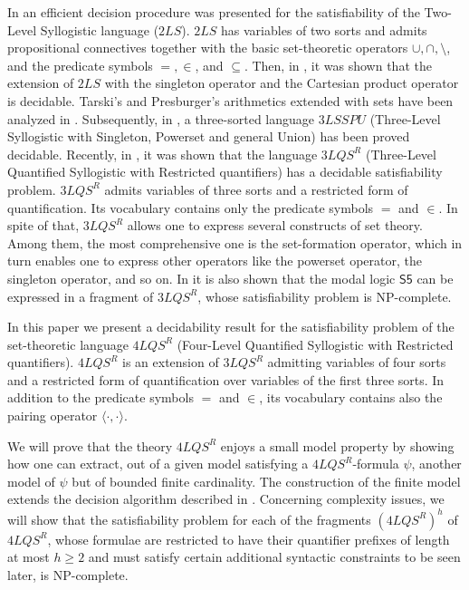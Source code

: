 \documentclass{fundam}
\newcommand{\Sc}{\mathsf{S5}}
\newcommand{\QLQSR}{\ensuremath{\mbox{$4\mathit{LQS}^{R}$}}\xspace}
\newcommand{\TLQSR}{\ensuremath{\mbox{$3\mathit{LQS}^{R}$}}\xspace}
\begin{document}
In \cite{FerOm1978} an efficient decision procedure was presented for
the satisfiability of the Two-Level Syllogistic language ($2LS$).
$2LS$ has variables of two sorts and admits propositional connectives
together with the basic set-theoretic operators $\cup,\cap,
\setminus$, and the predicate symbols $=,\in$, and $\subseteq$.  Then,
in \cite{CanCut90}, it was shown that the extension of $2LS$ with the
singleton operator and the Cartesian product operator is decidable.
Tarski's and Presburger's arithmetics extended with sets have been
analyzed in \cite{CCS90}.  Subsequently, in \cite{CanCut93}, a
three-sorted language $3LSSPU$ (Three-Level Syllogistic with
Singleton, Powerset and general Union) has been proved decidable.
Recently, in \cite{CanNic08}, it was shown that the language $\TLQSR$
(Three-Level Quantified Syllogistic with Restricted quantifiers) has a
decidable satisfiability problem.  $\TLQSR$ admits variables of three
sorts and a restricted form of quantification.  Its vocabulary
contains only the predicate symbols $=$ and $\in$.  In spite of that,
$\TLQSR$ allows one to express several constructs of set theory.
Among them, the most comprehensive one is the set-formation operator, which in
turn enables one to express other operators like the powerset
operator, the singleton operator, and so on.  In \cite{CanNic08} it is
also shown that the modal logic $\Sc$ can be expressed in a
fragment of $\TLQSR$, whose satisfiability problem is
\textsf{NP}-complete.

In this paper we present a decidability result for the satisfiability
problem of the set-theoretic language $\QLQSR$ (Four-Level Quantified
Syllogistic with Restricted quantifiers).  $\QLQSR$ is an extension of
$\TLQSR$ admitting variables of four sorts and a restricted form of
quantification over variables of the first three sorts.  In addition
to the predicate symbols $=$ and $\in$, its vocabulary contains also the
pairing operator $\langle \cdot,\cdot\rangle$.

We will prove that the theory $\QLQSR$ enjoys a small model property
by showing how one can extract, out of a given model satisfying a
$\QLQSR$-formula $\psi$, another model of $\psi$ but of bounded finite
cardinality.  The construction of the finite model extends the
decision algorithm described in \cite{CanNic08}.  Concerning complexity
issues, we will show that the satisfiability problem for each of the
fragments $(\QLQSR)^h$ of $\QLQSR$, whose formulae are restricted to
have their quantifier prefixes of length at most $h \geq 2$ and must
satisfy certain additional syntactic constraints to be seen later, is
\textsf{NP}-complete.
\end{document}
